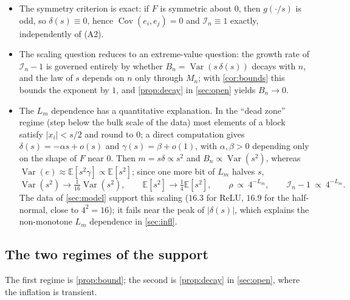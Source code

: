 \documentclass[review,hidelinks,oneeqnum,onetabnum,onefignum,onethmnum]{siamart251216}
\begin{document}
\begin{itemize}
\item The symmetry criterion is exact: if $F$ is symmetric about $0$, then
$g(\cdot/s)$ is odd, so $\delta(s)\equiv0$, hence
$\operatorname{Cov}(e_i,e_j)=0$ and $\mathcal I_n\equiv1$ exactly, independently
of (A2).

\item The scaling question reduces to an extreme-value question: the growth rate
of $\mathcal I_n-1$ is governed entirely by whether
$B_n=\operatorname{Var}(s\,\delta(s))$ decays with $n$, and the law of $s$
depends on $n$ only through $M_n$; with \cref{cor:bounds} this bounds the
exponent by $1$, and \cref{prop:decay} in \cref{sec:open} yields $B_n\to0$.

\item The $L_m$ dependence has a quantitative explanation. In the ``dead zone''
regime (step below the bulk scale of the data) most elements of a block satisfy
$|x_i|<s/2$ and round to $0$; a direct computation gives
$\delta(s)=-\alpha s+o(s)$ and $\gamma(s)=\beta+o(1)$, with $\alpha,\beta>0$
depending only on the shape of $F$ near $0$. Then $m=s\delta\propto s^2$ and
$B_n\propto\operatorname{Var}(s^2)$, whereas
$\operatorname{Var}(e)\approx\mathbb{E}[s^2\gamma]\propto\mathbb{E}[s^2]$; since
one more bit of $L_m$ halves $s$,
\begin{equation}
\operatorname{Var}(s^2)\to\tfrac1{16}\operatorname{Var}(s^2),\qquad
\mathbb{E}[s^2]\to\tfrac14\mathbb{E}[s^2],\qquad
\rho\ \propto\ 4^{-L_m},\qquad \mathcal I_n-1\ \propto\ 4^{-L_m}.
\label{eq:lmscaling}
\end{equation}
The data of \cref{sec:model} support this scaling ($16.3$ for ReLU, $16.9$ for
the half-normal, close to $4^{2}=16$); it fails near the peak of $|\delta(s)|$,
which explains the non-monotone $L_m$ dependence in \cref{sec:infl}.
\end{itemize}

\subsection{The two regimes of the support}
\label{sec:domains}

The first regime is \cref{prop:bound}; the second is \cref{prop:decay} in
\cref{sec:open}, where the inflation is transient.
\end{document}
